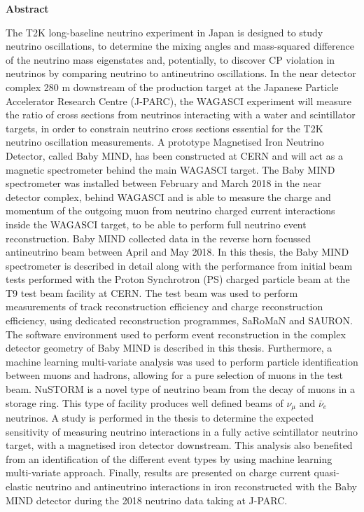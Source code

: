 \vspace*{0.75in}
\begin{center} {\bf Abstract}\end{center}

The T2K long-baseline neutrino experiment in Japan is designed to study neutrino oscillations, to determine the mixing angles and mass-squared difference of the neutrino mass eigenstates and, potentially, to discover CP violation in neutrinos by comparing neutrino to antineutrino oscillations. In the near detector complex 280 m downstream of the production target at the Japanese Particle Accelerator Research Centre (J-PARC), the WAGASCI experiment will measure the ratio of cross sections from neutrinos interacting with a water and scintillator targets, in order to constrain neutrino cross sections essential for the T2K neutrino oscillation measurements. A prototype Magnetised Iron Neutrino Detector, called Baby MIND, has been constructed at CERN and will act as a magnetic spectrometer behind the main WAGASCI target. The Baby MIND spectrometer was installed between February and March 2018 in the near detector complex, behind WAGASCI and is able to measure the charge and momentum of the outgoing muon from neutrino charged current interactions inside the WAGASCI target, to be able to perform full neutrino event reconstruction. Baby MIND collected data in the reverse horn focussed antineutrino beam between April and May 2018. In this thesis, the Baby MIND spectrometer is described in detail along with the performance from initial beam tests performed with the Proton Synchrotron (PS) charged particle beam at the T9 test beam facility at CERN. The test beam was used to perform measurements of track reconstruction efficiency and charge reconstruction efficiency, using dedicated reconstruction programmes, SaRoMaN and SAURON. The software environment used to perform event reconstruction in the complex detector geometry of Baby MIND is described in this thesis. Furthermore, a machine learning multi-variate analysis was used to perform particle identification between muons and hadrons, allowing for a pure selection of muons in the test beam. NuSTORM is a novel type of neutrino beam from the decay of muons in a storage ring. This type of facility produces well defined beams of $\nu_\mu$ and $\bar{\nu}_e$ neutrinos. A study is performed in the thesis to determine the expected sensitivity of measuring neutrino interactions in a fully active scintillator neutrino target, with a magnetised iron detector downstream. This analysis also benefited from an identification of the different event types by using machine learning multi-variate approach. Finally, results are presented on charge current quasi-elastic neutrino and antineutrino interactions in iron reconstructed with the Baby MIND detector during the 2018 neutrino data taking at J-PARC.

